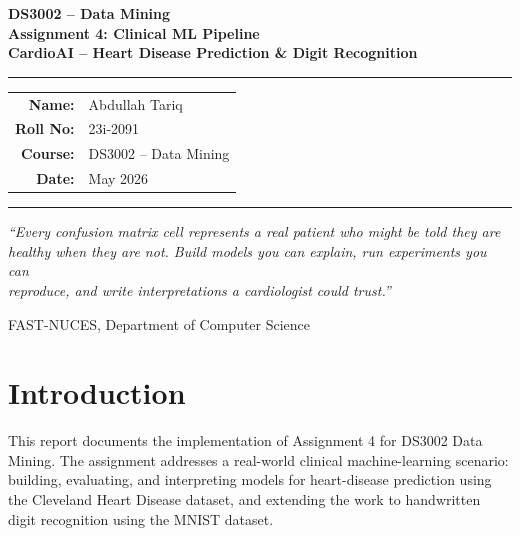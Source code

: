\documentclass[12pt,a4paper]{article}
\begin{document}
\begin{titlepage}
\centering
\vspace*{2cm}
{\Huge\bfseries\color{headerblue} DS3002 -- Data Mining\\[0.4em]
\large Assignment 4: Clinical ML Pipeline\\[0.2em]
\normalsize CardioAI -- Heart Disease Prediction \& Digit Recognition}

\vspace{1.5cm}
\rule{0.8\textwidth}{1pt}

\vspace{1cm}
\begin{tabular}{rl}
\textbf{Name:}    & Abdullah Tariq \\[4pt]
\textbf{Roll No:} & 23i-2091 \\[4pt]
\textbf{Course:}  & DS3002 -- Data Mining \\[4pt]
\textbf{Date:}    & May 2026 \\
\end{tabular}

\vspace{1cm}
\rule{0.8\textwidth}{1pt}

\vspace{2cm}
{\large\itshape
``Every confusion matrix cell represents a real patient who might be told they are\\
healthy when they are not. Build models you can explain, run experiments you can\\
reproduce, and write interpretations a cardiologist could trust.''}

\vfill
{\small FAST-NUCES, Department of Computer Science}
\end{titlepage}

\tableofcontents
\newpage

\section{Introduction}

This report documents the implementation of Assignment 4 for DS3002 Data Mining. The assignment addresses a real-world clinical machine-learning scenario: building, evaluating, and interpreting models for heart-disease prediction using the Cleveland Heart Disease dataset, and extending the work to handwritten digit recognition using the MNIST dataset.
\end{document}
